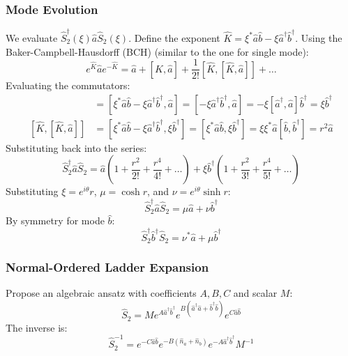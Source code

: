 {\subsubsection{Mode Evolution}
We evaluate $\hat{S}_2^\dagger(\xi) \hat{a} \hat{S}_2(\xi)$. Define the exponent $\hat{K} = \xi^*\hat{a}\hat{b} - \xi\hat{a}^\dagger\hat{b}^\dagger$. Using the Baker-Campbell-Hausdorff (BCH)  (similar to the one for single mode):
\begin{equation*}
e^{\hat{K}} \hat{a} e^{-\hat{K}} = \hat{a} + [\hat{K}, \hat{a}] + \frac{1}{2!}[\hat{K}, [\hat{K}, \hat{a}]] + \dots
\end{equation*}
Evaluating the commutators:
\begin{align*}
[\hat{K}, \hat{a}] &= [\xi^*\hat{a}\hat{b} - \xi\hat{a}^\dagger\hat{b}^\dagger, \hat{a}] = [-\xi\hat{a}^\dagger\hat{b}^\dagger, \hat{a}] = -\xi[\hat{a}^\dagger, \hat{a}]\hat{b}^\dagger = \xi\hat{b}^\dagger \\
[\hat{K}, [\hat{K}, \hat{a}]] &= [\xi^*\hat{a}\hat{b} - \xi\hat{a}^\dagger\hat{b}^\dagger, \xi\hat{b}^\dagger] = [\xi^*\hat{a}\hat{b}, \xi\hat{b}^\dagger] = \xi\xi^*\hat{a}[\hat{b}, \hat{b}^\dagger] = r^2\hat{a}
\end{align*}
Substituting back into the series:
\begin{equation*}
\hat{S}_2^\dagger \hat{a} \hat{S}_2 = \hat{a}\left(1 + \frac{r^2}{2!} + \frac{r^4}{4!} + \dots\right) + \xi\hat{b}^\dagger\left(1 + \frac{r^2}{3!} + \frac{r^4}{5!} + \dots\right)
\end{equation*}
Substituting $\xi = e^{i\theta}r$, $\mu = \cosh r$, and $\nu = e^{i\theta}\sinh r$:
\begin{equation}
\hat{S}_2^\dagger \hat{a} \hat{S}_2 = \mu\hat{a} + \nu\hat{b}^\dagger
\end{equation}
By symmetry for mode $\hat{b}$:
\begin{equation}
\hat{S}_2^\dagger \hat{b}^\dagger \hat{S}_2 = \nu^*\hat{a} + \mu\hat{b}^\dagger
\end{equation}

\subsubsection{Normal-Ordered Ladder Expansion}
Propose an algebraic ansatz with coefficients $A, B, C$ and scalar $M$:
\begin{equation*}
\hat{S}_2 = M e^{A\hat{a}^\dagger\hat{b}^\dagger} e^{B(\hat{a}^\dagger\hat{a} + \hat{b}^\dagger\hat{b})} e^{C\hat{a}\hat{b}}
\end{equation*}
The inverse is:
\begin{equation*}
\hat{S}_2^{-1} = e^{-C\hat{a}\hat{b}} e^{-B(\hat{n}_a + \hat{n}_b)} e^{-A\hat{a}^\dagger\hat{b}^\dagger} M^{-1}
\end{equation*}

}
